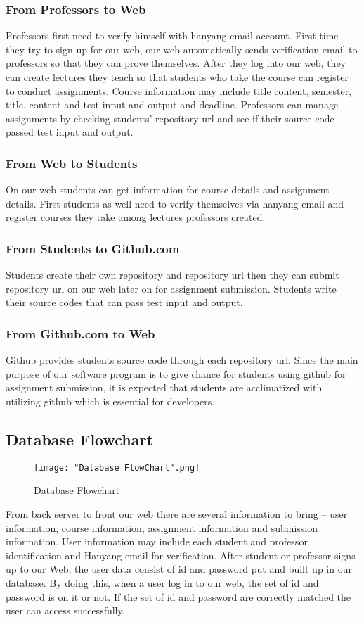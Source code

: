 \documentclass[10pt,journal,compsoc]{IEEEtran}
\begin{document}
\subsubsection{From Professors to Web}
Professors first need to verify himself with hanyang email account. First time they try to sign up for our web, our web automatically sends verification email to professors so that they can prove themselves. After they log into our web, they can create lectures they teach so that students who take the course can register to conduct assignments. Course information may include title content, semester, title, content and test input and output and deadline. Professors can manage assignments by checking students’ repository url and see if their source code passed test input and output.
\subsubsection{From Web to Students} 
On our web students can get information for course details and assignment details. First students as well need to verify themselves via hanyang email and register courses they take among lectures professors created. 
\subsubsection{From Students to Github.com} 
Students create their own repository and repository url then they can submit repository url on our web later on for assignment submission. Students write their source codes that can pass test input and output.
\subsubsection{From Github.com to Web}
Github provides students source code through each repository url. Since the main purpose of our software program is to give chance for students using github for assignment submission, it is expected that students are acclimatized with utilizing github which is essential for developers. 

\subsection {Database Flowchart}
\begin{figure}[H]
\centering
\texttt{[image: "Database FlowChart".png]}
{\caption*{Database Flowchart}}
\end{figure}
From back server to front our web there are several information to bring – user information, course information, assignment information and submission information. User information may include each student and professor identification and Hanyang email for verification. After student or professor signs up to our Web, the user data consist of id and password put and built up in our database. By doing this, when a user log in to our web, the set of id and password is on it or not. If the set of id and password are correctly matched the user can access successfully. 
\end{document}
